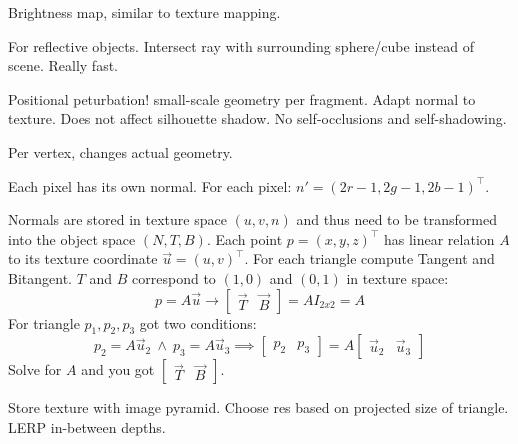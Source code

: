 \begin{definition}
  Brightness map, similar to texture mapping.
\end{definition}

\begin{definition}
  For reflective objects. Intersect ray with surrounding sphere/cube instead of scene. Really fast.
\end{definition}

\begin{definition}
  Positional peturbation!
  small-scale geometry per fragment.
  Adapt normal to texture.
  Does not affect silhouette shadow.
  No self-occlusions and self-shadowing.
\end{definition}

\begin{definition}
  Per vertex, changes actual geometry.
\end{definition}

\begin{definition}
  Each pixel has its own normal.
  For each pixel: \(n' = (2r - 1, 2g - 1, 2b - 1)^\top\).
\end{definition}

\begin{theorem}
  Normals are stored in texture space \((u, v, n)\) and thus need to be transformed into the object space \((N, T, B)\).
  Each point \(p = (x, y, z)^\top\) has linear relation \(A\) to its texture coordinate \(\vec{u} = (u, v)^\top\).
  For each triangle compute Tangent and Bitangent.
  \(T\) and \(B\) correspond to \((1, 0)\) and \((0, 1)\) in texture space:
  \[p = A \vec{u} \to \begin{bmatrix}
    \vec{T} & \vec{B}
  \end{bmatrix} = A I_{2 x 2} = A\]
  For triangle \(p_1, p_2, p_3\) got two conditions:
  \[p_2 = A \vec{u}_2 \ \land \ p_3 = A \vec{u}_3 \implies \begin{bmatrix}
    p_2 & p_3
  \end{bmatrix} = A \begin{bmatrix}
    \vec{u}_2 & \vec{u}_3
  \end{bmatrix}\]
  Solve for \(A\) and you got \(\begin{bmatrix}
    \vec{T} & \vec{B}
  \end{bmatrix}\).
\end{theorem}

\begin{definition}
  Store texture with image pyramid. Choose res based on projected size of triangle. LERP in-between depths.
\end{definition}
